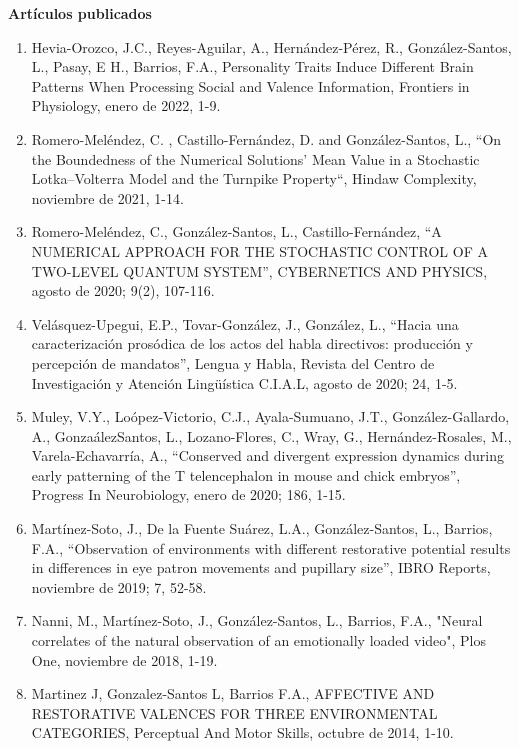 \documentclass[11pt]{article}
\begin{document}
\textbf{\color{red}Artículos publicados}

\begin{enumerate}
\item Hevia-Orozco, J.C., Reyes-Aguilar, A., Hernández-Pérez, R., González-Santos, L., Pasay, E H., Barrios, F.A., Personality Traits Induce Different Brain 
Patterns When Processing Social and Valence Information, Frontiers in Physiology, enero de 2022, 1-9.

\item Romero-Meléndez, C. , Castillo-Fernández, D. and González-Santos, L., “On the Boundedness of the Numerical Solutions’ Mean Value in a Stochastic 
Lotka–Volterra Model and the Turnpike Property“, Hindaw Complexity, noviembre de 2021, 1-14.

\item Romero-Meléndez, C., González-Santos, L., Castillo-Fernández, “A NUMERICAL APPROACH FOR THE STOCHASTIC CONTROL OF A TWO-LEVEL QUANTUM SYSTEM”, 
CYBERNETICS 
AND PHYSICS, agosto de 2020; 9(2), 107-116.

\item Velásquez-Upegui, E.P., Tovar-González, J., González, L., “Hacia una caracterización prosódica de los actos del habla directivos: producción y 
percepción de 
mandatos”, Lengua y Habla, Revista del Centro de Investigación y Atención Lingüística C.I.A.L, agosto de 2020; 24, 1-5.

\item Muley, V.Y., Loópez-Victorio, C.J., Ayala-Sumuano, J.T., González-Gallardo, A., GonzaálezSantos, L., Lozano-Flores, C., Wray, G., Hernández-Rosales, 
M., 
Varela-Echavarría, A., “Conserved and divergent expression dynamics during early patterning of the T telencephalon in mouse and chick embryos”, Progress In 
Neurobiology, enero de 2020; 186, 1-15.

\item Martínez-Soto, J., De la Fuente Suárez, L.A., González-Santos, L., Barrios, F.A., “Observation of environments with different restorative potential 
results 
in differences in eye patron movements and pupillary size”, IBRO Reports, noviembre de 2019; 7, 52-58.

\item Nanni, M., Martínez-Soto, J., González-Santos, L., Barrios, F.A., "Neural correlates of the natural observation of an emotionally loaded video", Plos 
One, 
noviembre de 2018, 1-19.

\item Martinez J, Gonzalez-Santos L, Barrios F.A., AFFECTIVE AND RESTORATIVE VALENCES FOR THREE ENVIRONMENTAL CATEGORIES, Perceptual And Motor Skills, 
octubre de 
2014, 1-10.


\end{enumerate}
\end{document}
